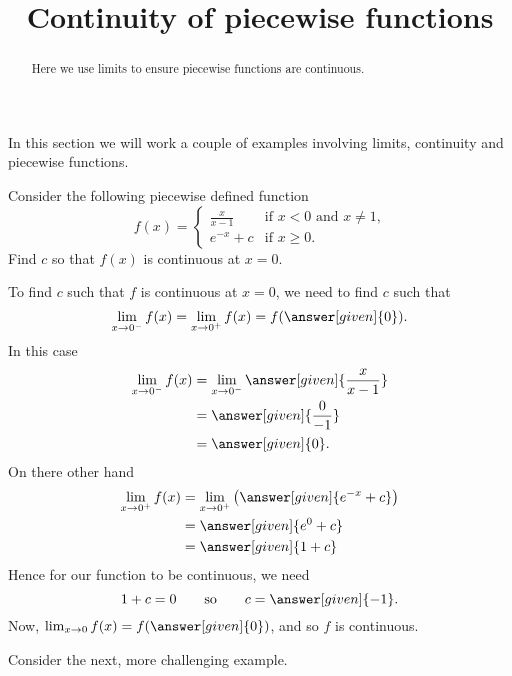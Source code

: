 \documentclass{ximera}
\title[Dig-In:]{Continuity of piecewise functions}
\begin{document}
\begin{abstract}
Here we use limits to ensure piecewise functions are continuous.
\end{abstract}
\maketitle

In this section we will work a couple of examples involving limits,
continuity and piecewise functions.

\begin{example}
Consider the following piecewise defined function
\[
f(x) = 
\begin{cases}
  \frac{x}{x-1} &\text{if $x<0$ and $x\ne 1$,}\\
  e^{-x} + c &\text{if $x\ge 0$}.
\end{cases}
\]
Find $c$ so that $f(x)$ is continuous at $x=0$.
\begin{explanation}
  To find $c$ such that $f$ is continuous at $x=0$, we need to find
  $c$ such that
  \[
  \lim_{x\to 0^-} f(x) = \lim_{x\to 0^+}f(x) = f(\answer[given]{0}).
  \]
  In this case
  \begin{align*}
    \lim_{x\to 0^-} f(x) &= \lim_{x\to 0^-}\answer[given]{\frac{x}{x-1}}\\
    &= \answer[given]{\frac{0}{-1}}\\
    &=\answer[given]{0}.
  \end{align*}
  On there other hand
  \begin{align*}
    \lim_{x\to 0^+} f(x) &= \lim_{x\to 0^+}\left(\answer[given]{e^{-x}+c}\right)\\
    &= \answer[given]{e^0 + c}\\
    &= \answer[given]{1+ c}
  \end{align*}
  Hence for our function to be continuous, we need
  \[
  1 + c = 0\qquad\text{so}\qquad c = \answer[given]{-1}.
  \]
  Now, $\lim_{x\to 0} f(x) = f(\answer[given]{0})$, and so $f$ is continuous.
\end{explanation}
\end{example}


Consider the next, more challenging example.
\end{document}

